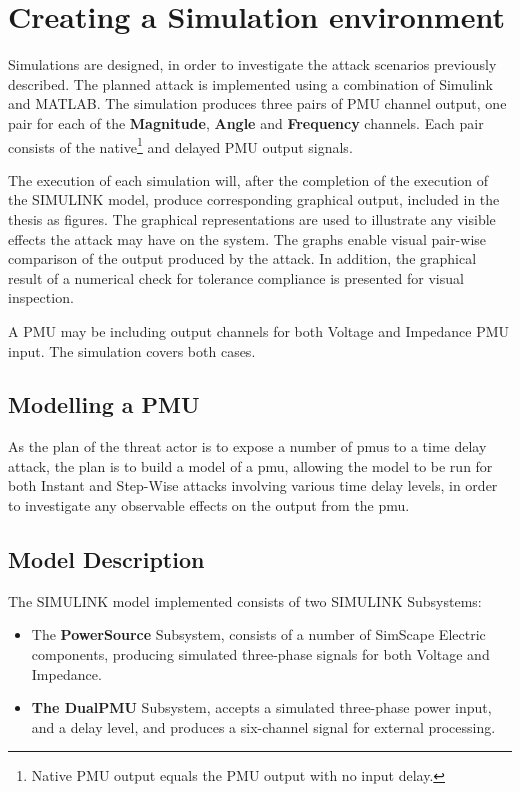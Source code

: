 \section{Creating a Simulation environment}

Simulations are designed, in order to investigate the attack scenarios previously described. The planned attack is implemented using a combination of Simulink and MATLAB. The simulation produces three pairs of PMU channel output, one pair for each of the \textbf{Magnitude}, \textbf{Angle} and \textbf{Frequency} channels.
Each pair consists of the native\footnote{Native PMU output equals the PMU output with no input delay.} and delayed  PMU output signals. 

The execution of each simulation will, after the completion of the execution of the SIMULINK model, produce corresponding graphical output, included in the thesis as figures. The graphical representations are used to illustrate any visible effects the attack may have on the system. The graphs enable visual pair-wise comparison of the output produced by the attack. In addition, the graphical result of a numerical check for tolerance compliance is presented for visual inspection.

A PMU may be including output channels for both Voltage and Impedance PMU input. The simulation covers both cases.
\subsection{Modelling a PMU}

As the plan of the threat actor is to expose  a number of \acrshort{pmu}s to a time  delay attack, the plan is to build a model of a \acrshort{pmu}, allowing the model to be run for both Instant and Step-Wise attacks involving various time delay levels, in order to investigate any observable effects on the output from the \acrshort{pmu}.
\subsection{Model Description}
The SIMULINK model implemented consists of two SIMULINK Subsystems:
\begin{itemize}
    \item The \textbf{PowerSource} Subsystem, consists of a number of SimScape Electric components, producing simulated three-phase signals for both  Voltage and Impedance.
    \item \textbf{The DualPMU} Subsystem, accepts a simulated three-phase power input, and a delay level, and produces a six-channel signal for external processing. 
\end{itemize}

